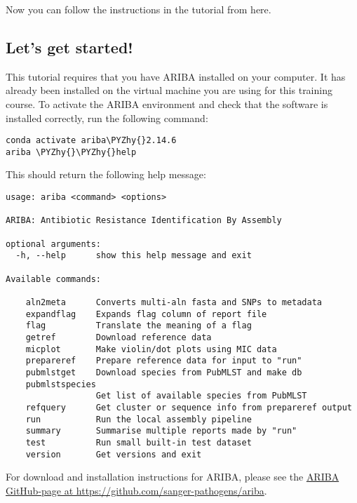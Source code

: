 \documentclass[11pt]{article}
\makeatletter
\def\PYZhy{\char`\-}
\newcommand{\boxspacing}{\kern\kvtcb@left@rule\kern\kvtcb@boxsep}
\newcommand{\prompt}[4]{
         {\ttfamily\llap{{\color{blue}\LARGE\faKeyboardO\hspace{3pt}#4}}\vspace{-\baselineskip}}
    }
\makeatother
\begin{document}
    Now you can follow the instructions in the tutorial from here.

\hypertarget{lets-get-started}{%
\subsection{Let's get started!}\label{lets-get-started}}

This tutorial requires that you have ARIBA installed on your computer.
It has already been installed on the virtual machine you are using for
this training course. To activate the ARIBA environment and check that
the software is installed correctly, run the following command:

    \begin{tcolorbox}[breakable, size=fbox, boxrule=1pt, pad at break*=1mm,colback=cellbackground, colframe=cellborder]
\prompt{In}{incolor}{ }{\boxspacing}
\begin{Verbatim}[commandchars=\\\{\}]
conda activate ariba\PYZhy{}2.14.6
ariba \PYZhy{}\PYZhy{}help
\end{Verbatim}
\end{tcolorbox}

    This should return the following help message:

\begin{verbatim}
usage: ariba <command> <options>

ARIBA: Antibiotic Resistance Identification By Assembly

optional arguments:
  -h, --help      show this help message and exit

Available commands:

    aln2meta      Converts multi-aln fasta and SNPs to metadata
    expandflag    Expands flag column of report file
    flag          Translate the meaning of a flag
    getref        Download reference data
    micplot       Make violin/dot plots using MIC data
    prepareref    Prepare reference data for input to "run"
    pubmlstget    Download species from PubMLST and make db
    pubmlstspecies
                  Get list of available species from PubMLST
    refquery      Get cluster or sequence info from prepareref output
    run           Run the local assembly pipeline
    summary       Summarise multiple reports made by "run"
    test          Run small built-in test dataset
    version       Get versions and exit
\end{verbatim}

For download and installation instructions for ARIBA, please see the
\href{https://github.com/sanger-pathogens/ariba}{ARIBA GitHub-page at
https://github.com/sanger-pathogens/ariba}.
\end{document}
